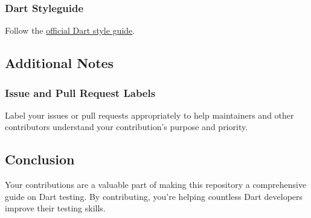 \documentclass[
]{article}
\begin{document}
\subsubsection{Dart Styleguide}\label{dart-styleguide}

Follow the
\href{https://dart.dev/guides/language/effective-dart/style}{official
Dart style guide}.

\subsection{Additional Notes}\label{additional-notes}

\subsubsection{Issue and Pull Request
Labels}\label{issue-and-pull-request-labels}

Label your issues or pull requests appropriately to help maintainers and
other contributors understand your contribution's purpose and priority.

\subsection{Conclusion}\label{conclusion-20}

Your contributions are a valuable part of making this repository a
comprehensive guide on Dart testing. By contributing, you're helping
countless Dart developers improve their testing skills.
\end{document}
